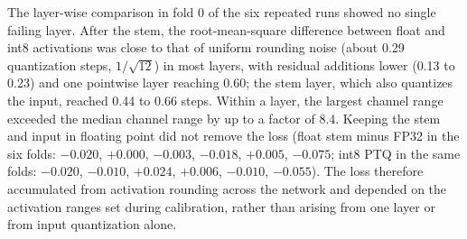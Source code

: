 \documentclass[preprint,12pt]{elsarticle}
\begin{document}
The layer-wise comparison in fold 0 of the six repeated runs showed no single failing layer. After the stem, the root-mean-square difference between float and int8 activations was close to that of uniform rounding noise (about 0.29 quantization steps, $1/\sqrt{12}$) in most layers, with residual additions lower (0.13 to 0.23) and one pointwise layer reaching 0.60; the stem layer, which also quantizes the input, reached 0.44 to 0.66 steps. Within a layer, the largest channel range exceeded the median channel range by up to a factor of 8.4. Keeping the stem and input in floating point did not remove the loss (float stem minus FP32 in the six folds: $-0.020$, $+0.000$, $-0.003$, $-0.018$, $+0.005$, $-0.075$; int8 PTQ in the same folds: $-0.020$, $-0.010$, $+0.024$, $+0.006$, $-0.010$, $-0.055$). The loss therefore accumulated from activation rounding across the network and depended on the activation ranges set during calibration, rather than arising from one layer or from input quantization alone.
\end{document}
